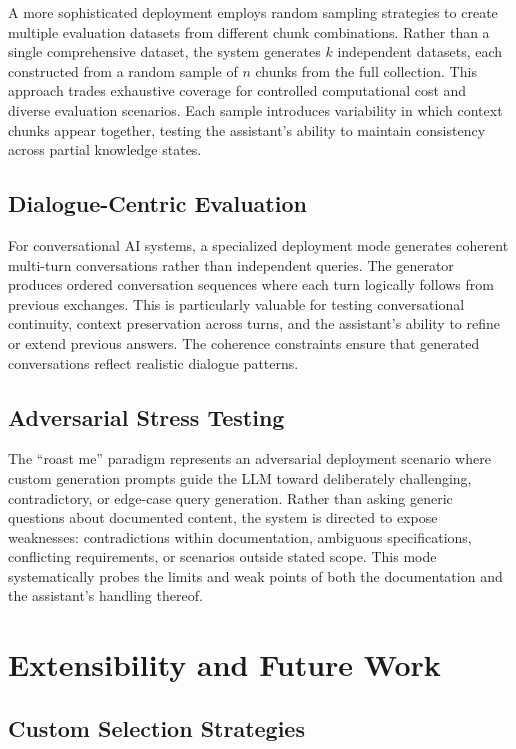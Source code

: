 \documentclass[11pt,a4paper]{article}
\begin{document}
A more sophisticated deployment employs random sampling strategies to create multiple evaluation datasets from different chunk combinations. Rather than a single comprehensive dataset, the system generates $k$ independent datasets, each constructed from a random sample of $n$ chunks from the full collection. This approach trades exhaustive coverage for controlled computational cost and diverse evaluation scenarios. Each sample introduces variability in which context chunks appear together, testing the assistant's ability to maintain consistency across partial knowledge states.

\subsection{Dialogue-Centric Evaluation}

For conversational AI systems, a specialized deployment mode generates coherent multi-turn conversations rather than independent queries. The generator produces ordered conversation sequences where each turn logically follows from previous exchanges. This is particularly valuable for testing conversational continuity, context preservation across turns, and the assistant's ability to refine or extend previous answers. The coherence constraints ensure that generated conversations reflect realistic dialogue patterns.

\subsection{Adversarial Stress Testing}

The ``roast me'' paradigm represents an adversarial deployment scenario where custom generation prompts guide the LLM toward deliberately challenging, contradictory, or edge-case query generation. Rather than asking generic questions about documented content, the system is directed to expose weaknesses: contradictions within documentation, ambiguous specifications, conflicting requirements, or scenarios outside stated scope. This mode systematically probes the limits and weak points of both the documentation and the assistant's handling thereof.

\section{Extensibility and Future Work}

\subsection{Custom Selection Strategies}
\end{document}

